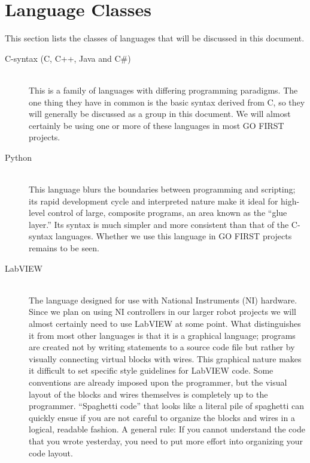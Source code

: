 \documentclass{article}
\begin{document}
\section{Language Classes}
This section lists the classes of languages that will be discussed in this document.
\begin{description}
    \item[C-syntax (C, C++, Java and C\#)] \hfill \\
        This is a family of languages with differing programming paradigms. The one thing they have in common is the basic syntax derived from C, so they will generally be discussed as a group in this document. We will almost certainly be using one or more of these languages in most GO FIRST projects.
    \item[Python] \hfill \\
        This language blurs the boundaries between programming and scripting; its rapid development cycle and interpreted nature make it ideal for high-level control of large, composite programs, an area known as the ``glue layer.'' Its syntax is much simpler and more consistent than that of the C-syntax languages. Whether we use this language in GO FIRST projects remains to be seen.
    \item[LabVIEW] \hfill \\
        The language designed for use with National Instruments (NI) hardware. Since we plan on using NI controllers in our larger robot projects we will almost certainly need to use LabVIEW at some point. What distinguishes it from most other languages is that it is a graphical language; programs are created not by writing statements to a source code file but rather by visually connecting virtual blocks with wires. This graphical nature makes it difficult to set specific style guidelines for LabVIEW code. Some conventions are already imposed upon the programmer, but the visual layout of the blocks and wires themselves is completely up to the programmer. ``Spaghetti code'' that looks like a literal pile of spaghetti can quickly ensue if you are not careful to organize the blocks and wires in a logical, readable fashion. A general rule: If you cannot understand the code that you wrote yesterday, you need to put more effort into organizing your code layout.
\end{description}
\end{document}
